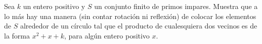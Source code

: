 Sea $k$ un entero positivo y $S$ un conjunto finito de primos impares. Muestra que a lo más hay una manera (sin contar rotación ni reflexión) de colocar los elementos de $S$ alrededor de un círculo tal que el producto de cualesquiera dos vecinos es de la forma $x^2+x+k$, para algún entero positivo $x$.